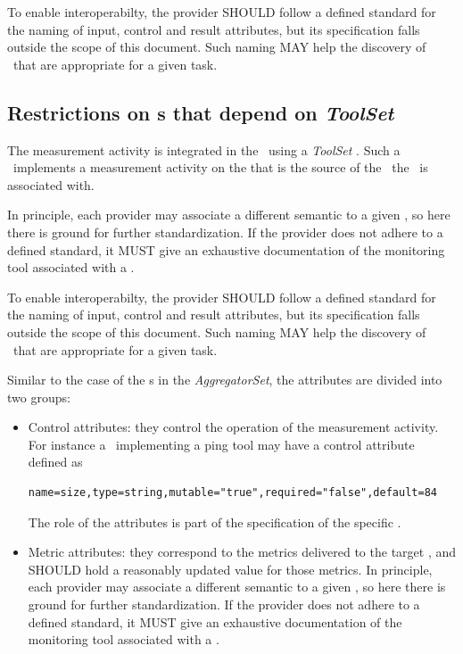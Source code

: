 \documentclass[12pt]{article}  %
\begin{document}
To enable interoperabilty, the provider SHOULD follow a defined standard for the naming of input, control and result attributes, but its specification falls outside the scope of this document. Such naming MAY help the discovery of \mi\ that are appropriate for a given task.


\subsection{Restrictions on \mi s that depend on {\em ToolSet} \label{sec:Tool}}

The measurement activity is integrated in the \coll\ using a {\em ToolSet} \mi . Such a \mi\ implements a measurement activity on the \rs that is the source of the \sens\ the \mi\ is associated with.

In principle, each provider may associate a different semantic to a given \mi, so here there is ground for further standardization. If the provider does not adhere to a defined standard, it MUST give an exhaustive documentation of the monitoring tool associated with a \mi.

To enable interoperabilty, the provider SHOULD follow a defined standard for the naming of input, control and result attributes, but its specification falls outside the scope of this document. Such naming MAY help the discovery of \mi\ that are appropriate for a given task.

Similar to the case of the \mi s in the {\em AggregatorSet}, the attributes are divided into two groups:
\begin{itemize}
\item Control attributes: they control the operation of the measurement activity. For instance a \mi\ implementing a ping tool may have a control attribute defined as 
\begin{verbatim}
name=size,type=string,mutable="true",required="false",default=84
\end{verbatim}
The role of the attributes is part of the specification of the specific \mi.
\item Metric attributes: they correspond to the metrics delivered to the target \sens, and SHOULD hold a reasonably updated value for those metrics. In principle, each provider may associate a different semantic to a given \mi, so here there is ground for further standardization. If the provider does not adhere to a defined standard, it MUST give an exhaustive documentation of the monitoring tool associated with a \mi.
\end{itemize}
\end{document}
